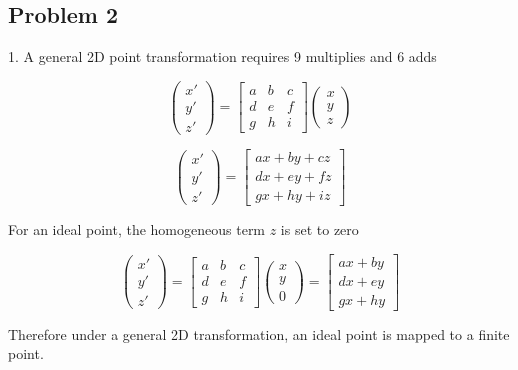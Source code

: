 \documentclass[conference]{IEEEtran}
\begin{document}
\subsection{Problem 2}

1. A general 2D point transformation  requires 9 multiplies and 6 adds

\[ \begin{pmatrix} x{'}\\y{'}\\z{'} \end{pmatrix} = 
\begin{bmatrix}
a & b & c\\
d & e & f\\
g & h & i
\end{bmatrix}\begin{pmatrix} x\\y\\z \end{pmatrix}
 \]
 
 \[ \begin{pmatrix} x{'}\\y{'}\\z{'} \end{pmatrix} = 
\begin{bmatrix}
ax + by + cz\\
dx + ey + fz\\
gx + hy + iz
\end{bmatrix}
 \]
 
For an ideal point, the homogeneous term \( z \) is set to zero
 
 \[ \begin{pmatrix} x{'}\\y{'}\\z{'} \end{pmatrix} = 
\begin{bmatrix}
a & b & c\\
d & e & f\\
g & h & i
\end{bmatrix}\begin{pmatrix} x\\y\\0 \end{pmatrix} =
\begin{bmatrix}
ax + by \\
dx + ey \\
gx + hy 
\end{bmatrix}
 \]
 
 Therefore under a general 2D transformation, an ideal point is mapped to a finite point. 
\end{document}
